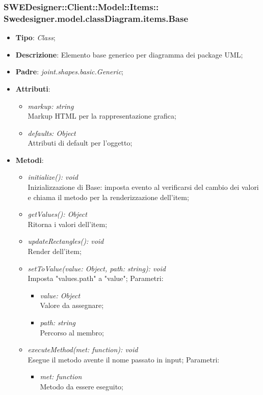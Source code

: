 \documentclass[../DefinizioneDiProdotto.tex]{subfiles}
\begin{document}
			
			\subsubsection[Swedesigner.model.classDiagram.items.Base]{SWEDesigner::Client::Model::Items::\\Swedesigner.model.classDiagram.items.Base}
			\hypertarget{SWEDesigner::Client::Model::Items::Swedesigner.model.classDiagram.items.Base}{}
			\begin{itemize}
				\item \textbf{Tipo}: \emph{Class};
				\item \textbf{Descrizione}: Elemento base generico per diagramma dei package UML;
				\item \textbf{Padre}: \emph{joint.shapes.basic.Generic};
				\item \textbf{Attributi}:
				\begin{itemize}
					\item \emph{markup: string}\\
					Markup HTML per la rappresentazione grafica;
					\item \emph{defaults: Object}\\
					Attributi di default per l'oggetto;
				\end{itemize}
				\item \textbf{Metodi}:
				\begin{itemize}
					\item \emph{initialize(): void}\\
					Inizializzazione di Base: imposta evento al verificarsi del cambio dei valori e chiama il metodo per la renderizzazione dell'item;
					\item \emph{getValues(): Object}\\
					Ritorna i valori dell'item;
					\item \emph{updateRectangles(): void}\\
					Render dell'item;	
					\item \emph{setToValue(value: Object, path: string): void}\\
					Imposta "values.path" a "value";
					Parametri:
					\begin{itemize}
						\item \emph{value: Object} \\
						Valore da assegnare;
						\item \emph{path: string} \\
						Percorso al membro;
					\end{itemize}
					\item \emph{executeMethod(met: function): void}\\
					Esegue il metodo avente il nome passato in input;
					Parametri:
					\begin{itemize}
						\item \emph{met: function} \\
						Metodo da essere eseguito;
					\end{itemize}
				\end{itemize}
			\end{itemize}
			
\end{document}
